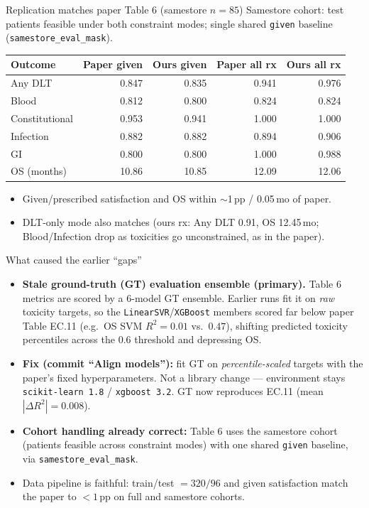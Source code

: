 \documentclass{beamer}
\begin{document}
\begin{frame}{Replication matches paper Table 6 (samestore $n{=}85$)}
  \scriptsize
  Samestore cohort: test patients feasible under both constraint modes; single
  shared \texttt{given} baseline (\texttt{samestore\_eval\_mask}).

  \medskip
  \begin{tabular}{lrrrr}
    \hline
    Outcome & Paper given & Ours given & Paper all rx & Ours all rx \\
    \hline
    Any DLT        & 0.847 & 0.835 & 0.941 & 0.976 \\
    Blood          & 0.812 & 0.800 & 0.824 & 0.824 \\
    Constitutional & 0.953 & 0.941 & 1.000 & 1.000 \\
    Infection      & 0.882 & 0.882 & 0.894 & 0.906 \\
    GI             & 0.800 & 0.800 & 1.000 & 0.988 \\
    OS (months)    & 10.86 & 10.85 & 12.09 & 12.06 \\
    \hline
  \end{tabular}

  \vspace{0.5em}
  \normalsize
  \begin{itemize}
    \item Given/prescribed satisfaction and OS within $\sim$1\,pp / 0.05\,mo of paper.
    \item DLT-only mode also matches (ours rx: Any DLT 0.91, OS 12.45\,mo;
      Blood/Infection drop as toxicities go unconstrained, as in the paper).
  \end{itemize}
\end{frame}

\begin{frame}{What caused the earlier ``gaps''}
  \begin{itemize}
    \item \textbf{Stale ground-truth (GT) evaluation ensemble (primary).} Table 6
      metrics are scored by a 6-model GT ensemble. Earlier runs fit it on
      \emph{raw} toxicity targets, so the \texttt{LinearSVR}/\texttt{XGBoost}
      members scored far below paper Table EC.11 (e.g.\ OS SVM $R^2{=}0.01$ vs.\
      $0.47$), shifting predicted toxicity percentiles across the $0.6$ threshold
      and depressing OS.
    \item \textbf{Fix (commit ``Align models''):} fit GT on \emph{percentile-scaled}
      targets with the paper's fixed hyperparameters. Not a library change ---
      environment stays \texttt{scikit-learn 1.8} / \texttt{xgboost 3.2}. GT now
      reproduces EC.11 (mean $|\Delta R^2|{=}0.008$).
    \item \textbf{Cohort handling already correct:} Table 6 uses the samestore
      cohort (patients feasible across constraint modes) with one shared
      \texttt{given} baseline, via \texttt{samestore\_eval\_mask}.
    \item Data pipeline is faithful: train/test $=320/96$ and given satisfaction
      match the paper to $<1$\,pp on full and samestore cohorts.
  \end{itemize}
\end{frame}
\end{document}
